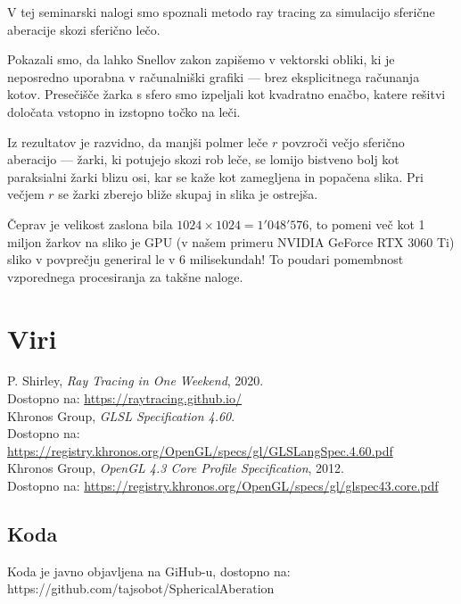 \documentclass[a4paper,12pt]{article}
\begin{document}
    V tej seminarski nalogi smo spoznali metodo ray tracing za simulacijo sferične aberacije skozi
    sferično lečo.

    Pokazali smo, da lahko Snellov zakon zapišemo v vektorski obliki, ki je neposredno uporabna
    v računalniški grafiki — brez eksplicitnega računanja kotov. Presečišče žarka s sfero smo
    izpeljali kot kvadratno enačbo, katere rešitvi določata vstopno in izstopno točko na leči.

    Iz rezultatov je razvidno, da manjši polmer leče $r$ povzroči večjo sferično aberacijo —
    žarki, ki potujejo skozi rob leče, se lomijo bistveno bolj kot paraksialni žarki blizu osi,
    kar se kaže kot zamegljena in popačena slika. Pri večjem $r$ se žarki zberejo bliže skupaj
    in slika je ostrejša.

    Čeprav je velikost zaslona bila $1024 \times 1024 = 1'048'576$, to pomeni več kot 1 miljon žarkov na sliko je GPU (v našem primeru NVIDIA GeForce RTX 3060 Ti) sliko v povprečju generiral le v 6 milisekundah!
    To poudari pomembnost vzporednega procesiranja za takšne naloge.

    \pagebreak
    \section{Viri}

    P. Shirley, \textit{Ray Tracing in One Weekend}, 2020. \\
    Dostopno na: \url{https://raytracing.github.io/} \\
    \vspace{0.5cm}
    Khronos Group, \textit{GLSL Specification 4.60}. \\
    Dostopno na: \url{https://registry.khronos.org/OpenGL/specs/gl/GLSLangSpec.4.60.pdf}\\
    \vspace{0.5cm}
    Khronos Group, \textit{OpenGL 4.3 Core Profile Specification}, 2012. \\
    Dostopno na: \url{https://registry.khronos.org/OpenGL/specs/gl/glspec43.core.pdf}\\
    \vspace{0.5cm}
    \subsection{Koda}
    Koda je javno objavljena na GiHub-u, dostopno na: https://github.com/tajsobot/SphericalAberation \\
\end{document}
